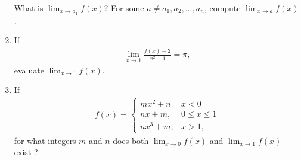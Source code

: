 \begin{enumerate}[label=\arabic*.,ref=\thesubsection.\theenumi]
%
What is $\lim_{x\to a_1} f(x)$?  For some $a \ne a_1, a_2, \dots, a_n$, compute $\lim_{x\to a} f(x)$.
%
\item If 
%
\begin{align}
\lim_{x\to 1} \frac{f(x)-2}{x^2-1} = \pi, 
\end{align}
%
evaluate $\lim_{x\to 1} f(x)$.
%
\item If 
%
\begin{align}
f(x) = 
\begin{cases}
mx^2+n & x < 0
\\
nx +m, & 0\le x \le 1
\\
nx^3+m, & x > 1,
\end{cases}
\end{align}
%
for what integers $m$ and $n$ does both  $\lim_{x\to 0} f(x)$ and $\lim_{x\to 1} f(x)$ exist ?
%

\end{enumerate}
